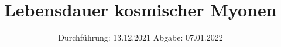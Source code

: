
\setlength\parindent{0pt}
\subject{V01}
\title{Lebensdauer kosmischer Myonen}
\date{%
  Durchführung: 13.12.2021
  \hspace{3em}
  Abgabe: 07.01.2022 \\
}



\maketitle
\thispagestyle{empty}
\tableofcontents
\newpage







\newpage
\nocite{*}
\printbibliography
\appendix



